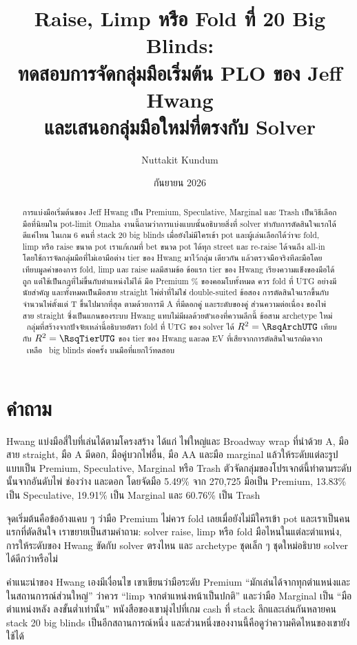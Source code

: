 \documentclass[11pt]{article}
\title{Raise, Limp หรือ Fold ที่ 20 Big Blinds:\\
ทดสอบการจัดกลุ่มมือเริ่มต้น PLO ของ Jeff Hwang\\และเสนอกลุ่มมือใหม่ที่ตรงกับ Solver}
\author{Nuttakit Kundum}
\date{กันยายน 2026}
\begin{document}
\maketitle

\begin{abstract}
การแบ่งมือเริ่มต้นของ Jeff Hwang เป็น Premium, Speculative, Marginal และ Trash เป็นวิธีเลือกมือที่นิยมใน
pot-limit Omaha งานนี้ถามว่าการแบ่งแบบนั้นอธิบายสิ่งที่ solver ทำกับการตัดสินใจแรกได้ดีแค่ไหน ในเกม 6 คนที่ stack
20 big blinds เมื่อยังไม่มีใครเข้า pot และผู้เล่นเลือกได้ว่าจะ fold, limp หรือ raise ขนาด pot เราแก้เกมที่ bet
ขนาด pot ได้ทุก street และ re-raise ได้จนถึง all-in โดยใช้การจัดกลุ่มมือที่ไม่เอามือต่าง tier ของ Hwang มาไว้กลุ่ม
เดียวกัน แล้วตรวจมือจริงทีละมือโดยเทียบมูลค่าของการ fold, limp และ raise ผลมีสามข้อ ข้อแรก tier ของ Hwang
เรียงความแข็งของมือได้ถูก แต่ใช้เป็นกฎที่ไม่ขึ้นกับตำแหน่งไม่ได้ มือ Premium \PremFoldUTG\% ของคอมโบทั้งหมด
ควร fold ที่ UTG อย่างมีนัยสำคัญ และทั้งหมดเป็นมือสาย straight ไพ่ต่ำที่ไม่ใช่ double-suited ข้อสอง
การตัดสินใจแรกขึ้นกับจำนวนไพ่ตั้งแต่ T ขึ้นไปมากที่สุด ตามด้วยการมี A ที่มีดอกคู่ และระดับของคู่ ส่วนความต่อเนื่อง
ของไพ่สาย straight ซึ่งเป็นแกนของระบบ Hwang แทบไม่มีผลด้วยตัวเองที่ความลึกนี้ ข้อสาม archetype ใหม่
\ArchCount\ กลุ่มที่สร้างจากปัจจัยเหล่านี้อธิบายอัตรา fold ที่ UTG ของ solver ได้ $R^2 = \RsqArchUTG$ เทียบกับ
$R^2 = \RsqTierUTG$ ของ tier ของ Hwang และลด EV ที่เสียจากการตัดสินใจแรกผิดจาก \LossHwangUTG\ เหลือ
\LossArchUTG\ big blinds ต่อครั้ง บนมือที่แยกไว้ทดสอบ
\end{abstract}

\section{คำถาม}
Hwang แบ่งมือสี่ใบที่เล่นได้ตามโครงสร้าง ได้แก่ ไพ่ใหญ่และ Broadway wrap ที่นำด้วย A, มือสาย straight,
มือ A มีดอก, มือคู่บวกไพ่อื่น, มือ AA และมือ marginal \cite{hwang} แล้วให้ระดับแต่ละรูปแบบเป็น Premium,
Speculative, Marginal หรือ Trash ตัวจัดกลุ่มของโปรเจกต์นี้ทำตามระดับนั้นจากอันดับไพ่ ช่องว่าง และดอก โดยจัดมือ
5.49\% จาก 270{,}725 มือเป็น Premium, 13.83\% เป็น Speculative, 19.91\% เป็น Marginal และ 60.76\% เป็น Trash

จุดเริ่มต้นคือข้ออ้างแคบ ๆ ว่ามือ Premium ไม่ควร fold เลยเมื่อยังไม่มีใครเข้า pot และเราเป็นคนแรกที่ตัดสินใจ
เราขยายเป็นสามคำถาม: solver raise, limp หรือ fold มือไหนในแต่ละตำแหน่ง, การให้ระดับของ Hwang ขัดกับ solver
ตรงไหน และ archetype ชุดเล็ก ๆ ชุดใหม่อธิบาย solver ได้ดีกว่าหรือไม่

คำแนะนำของ Hwang เองมีเงื่อนไข เขาเขียนว่ามือระดับ Premium ``มักเล่นได้จากทุกตำแหน่งและในสถานการณ์ส่วนใหญ่''
ว่าควร ``limp จากตำแหน่งหน้าเป็นปกติ'' และว่ามือ Marginal เป็น ``มือตำแหน่งหลัง ลงขั้นต่ำเท่านั้น'' \cite{hwang}
หนังสือของเขามุ่งไปที่เกม cash ที่ stack ลึกและเล่นกันหลายคน stack 20 big blinds เป็นอีกสถานการณ์หนึ่ง
และส่วนหนึ่งของงานนี้คือดูว่าความคิดไหนของเขายังใช้ได้
\end{document}
